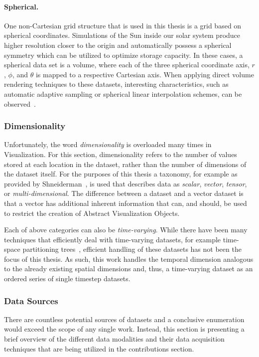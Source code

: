 \paragraph{Spherical. }  One non-Cartesian grid structure that is used in this thesis is a grid based on spherical coordinates.  Simulations of the Sun inside our solar system produce higher resolution closer to the origin and automatically possess a spherical symmetry which can be utilized to optimize storage capacity.  In these cases, a spherical data set is a  volume, where each of the three spherical coordinate axis, $r$, $\phi$, and $\theta$ is mapped to a respective Cartesian axis.  When applying direct volume rendering techniques to these datasets, interesting characteristics, such as automatic adaptive sampling or spherical linear interpolation schemes, can be observed~\cite{balabanian2007sonar}.

\subsubsection{Dimensionality} \label{cha:intro:vp:da:dimensionality}
Unfortunately, the word \emph{dimensionality} is overloaded many times in Visualization.  For this section, dimensionality refers to the number of values stored at each location in the dataset, rather than the number of dimensions of the dataset itself.  For the purposes of this thesis a taxonomy, for example as provided by Shneiderman~\cite{shneiderman1996eyes}, is used that describes data as \emph{scalar}, \emph{vector}, \emph{tensor}, or \emph{multi-dimensional}.  The difference between a  dataset and a vector dataset is that a vector has additional inherent information that can, and should, be used to restrict the creation of Abstract Visualization Objects.

Each of above categories can also be \emph{time-varying}.  While there have been many techniques that efficiently deal with time-varying datasets, for example time-space partitioning trees~\cite{shen1999fast}, efficient handling of these datasets has not been the focus of this thesis.  As such, this work handles the temporal dimension analogous to the already existing spatial dimensions and, thus, a time-varying dataset as an ordered series of single timestep datasets.

\subsubsection{Data Sources} \label{cha:intro:vp:da:sources}
There are countless potential sources of datasets and a conclusive enumeration would exceed the scope of any single work.  Instead, this section is presenting a brief overview of the different data modalities and their data acquisition techniques that are being utilized in the contributions section.


